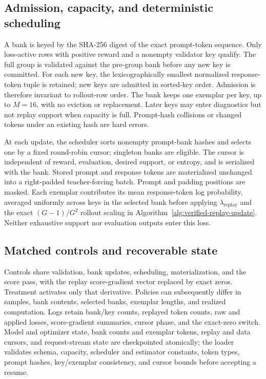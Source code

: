 \documentclass{article}
\newcommand{\1}{\mathbf 1}
\theoremstyle{remark}
\theoremstyle{definition}
\theoremstyle{plain}
\begin{document}
\subsection{Admission, capacity, and deterministic scheduling}
\label{app:algorithm-bank}

A bank is keyed by the SHA-256 digest of the exact prompt-token sequence.
Only loss-active rows with positive reward and a nonempty validator key
qualify. The full group is validated against the pre-group bank before
any new key is committed. For each new key, the lexicographically smallest
normalized response-token tuple is retained; new keys are admitted in
sorted-key order. Admission is therefore invariant to rollout-row order.
The bank keeps one exemplar per key, up to $M=16$, with no eviction or
replacement. Later keys may enter diagnostics but not replay support when
capacity is full. Prompt-hash collisions or changed tokens under an
existing hash are hard errors.

\label{app:algorithm-schedule}
At each update, the scheduler sorts nonempty prompt-bank hashes and selects
one by a fixed round-robin cursor; singleton banks are eligible. The cursor
is independent of reward, evaluation, desired support, or entropy, and is
serialized with the bank. Stored prompt and response tokens are
materialized unchanged into a right-padded teacher-forcing batch. Prompt
and padding positions are masked. Each exemplar contributes its mean
response-token log probability, averaged uniformly across keys in the
selected bank before applying $\lambda_{\mathrm{replay}}$ and the exact
$(G-1)/G^2$ rollout scaling in
Algorithm~\ref{alg:verified-replay-update}. Neither exhaustive support nor
evaluation outputs enter this loss.

\subsection{Matched controls and recoverable state}
\label{app:algorithm-control}

Controls share validation, bank updates, scheduling, materialization, and
the score pass, with the replay score-gradient vector replaced by exact
zeros. Treatment activates only that derivative. Policies can subsequently
differ in samples, bank contents, selected banks, exemplar lengths, and
realized computation. Logs retain bank/key counts, replayed token counts,
raw and applied losses, score-gradient summaries, cursor phase, and the
exact-zero switch. Model and optimizer state, bank counts and exemplar
tokens, replay and data cursors, and request-stream state are checkpointed
atomically; the loader validates schema, capacity, scheduler and estimator
constants, token types, prompt hashes, key/exemplar consistency, and cursor
bounds before accepting a resume.
\end{document}
